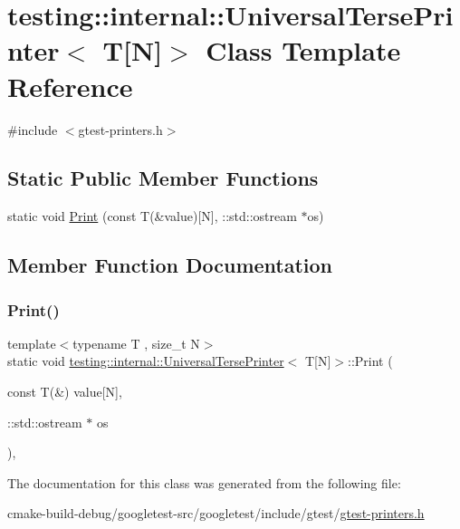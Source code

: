 \hypertarget{classtesting_1_1internal_1_1UniversalTersePrinter_3_01T[N]_4}{}\section{testing\+::internal\+::Universal\+Terse\+Printer$<$ T\mbox{[}N\mbox{]}$>$ Class Template Reference}
\label{classtesting_1_1internal_1_1UniversalTersePrinter_3_01T[N]_4}


{\ttfamily \#include $<$gtest-\/printers.\+h$>$}

\subsection*{Static Public Member Functions}
\begin{DoxyCompactItemize}
\item 
static void \mbox{\hyperlink{classtesting_1_1internal_1_1UniversalTersePrinter_3_01T[N]_4_a9e0ceb62fda7dc46ebcf5f911e459a49}{Print}} (const T(\&value)\mbox{[}N\mbox{]}, \+::std\+::ostream $\ast$os)
\end{DoxyCompactItemize}


\subsection{Member Function Documentation}
\mbox{\label{classtesting_1_1internal_1_1UniversalTersePrinter_3_01T[N]_4_a9e0ceb62fda7dc46ebcf5f911e459a49}} 
\subsubsection{\texorpdfstring{Print()}{Print()}}
{\footnotesize\ttfamily template$<$typename T , size\+\_\+t N$>$ \\
static void \mbox{\hyperlink{classtesting_1_1internal_1_1UniversalTersePrinter}{testing\+::internal\+::\+Universal\+Terse\+Printer}}$<$ T\mbox{[}N\mbox{]}$>$\+::Print (\begin{DoxyParamCaption}\item[{const T(\&)}]{value\mbox{[}\+N\mbox{]},  }\item[{\+::std\+::ostream $\ast$}]{os }\end{DoxyParamCaption})\hspace{0.3cm}{\ttfamily [inline]}, {\ttfamily [static]}}



The documentation for this class was generated from the following file\+:\begin{DoxyCompactItemize}
\item 
cmake-\/build-\/debug/googletest-\/src/googletest/include/gtest/\mbox{\hyperlink{gtest-printers_8h}{gtest-\/printers.\+h}}\end{DoxyCompactItemize}
